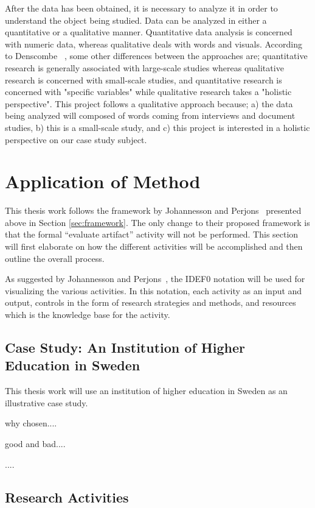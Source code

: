 After the data has been obtained, it is necessary to analyze it in order to understand the object being studied. Data can be analyzed in either a quantitative or a qualitative manner. Quantitative data analysis is concerned with numeric data, whereas qualitative deals with words and visuals. According to Denscombe ~\cite{denscombe2010good}, some other differences between the approaches are; quantitative research is generally associated with large-scale studies whereas qualitative research is concerned with small-scale studies, and quantitative research is concerned with "specific variables" while qualitative research takes a "holistic perspective". This project follows a qualitative approach because; a) the data being analyzed will composed of words coming from interviews and document studies, b) this is a small-scale study, and c) this project is interested in a holistic perspective on our case study subject.

\section{Application of Method}

This thesis work follows the framework by Johannesson and Perjons~\cite{johannessonPerjons2012} presented above in Section \ref{sec:framework}. The only change to their proposed framework is that the formal ``evaluate artifact'' activity will not be performed. This section will first elaborate on how the different activities will be accomplished and then outline the overall process. 

As suggested by Johannesson and Perjons~\cite[Ch. 4]{johannessonPerjons2012}, the IDEF0 notation will be used for visualizing the various activities. In this notation, each activity as an input and output, controls in the form of research strategies and methods, and resources which is the knowledge base for the activity. 

\subsection{Case Study: An Institution of Higher Education in Sweden}
\label{sec:case}

This thesis work will use an institution of higher education in Sweden as an illustrative case study. 


why chosen....


good and bad....


....

\subsection{Research Activities}
